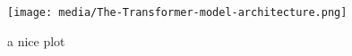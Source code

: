 \begin{figure}[h]
    \centering
    \texttt{[image: media/The-Transformer-model-architecture.png]}
    \caption{a nice plot}
    \label{fig:a}
\end{figure}